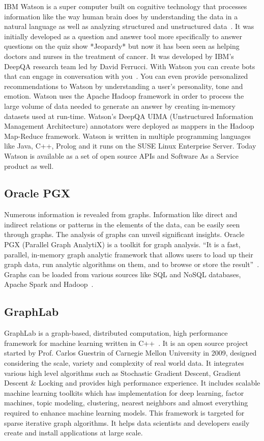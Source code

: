IBM Watson is a super computer built on cognitive technology that
processes information like the way human brain does by understanding
the data in a natural language as well as analyzing structured and
unstructured data~\cite{www-ibmwatson-wiki}.  It was initially
developed as a question and answer tool more specifically to answer
questions on the quiz show *Jeopardy* but now it has been seen as
helping doctors and nurses in the treatment of cancer. It was
developed by IBM's DeepQA research team led by David Ferrucci. With
Watson you can create bots that can engage in conversation with
you~\cite{www-ibmwatson}. You can even provide personalized
recommendations to Watson by understanding a user's personality, tone
and emotion. Watson uses the Apache Hadoop framework in order to
process the large volume of data needed to generate an answer by
creating in-memory datasets used at run-time. Watson's DeepQA UIMA
(Unstructured Information Management Architecture) annotators were
deployed as mappers in the Hadoop Map-Reduce framework. Watson is
written in multiple programming languages like Java, C++, Prolog and
it runs on the SUSE Linux Enterprise Server. Today Watson is available
as a set of open source APIs and Software As a Service product as
well\cite{www-ibmwatson}.

    \pv
    
\subsection{Oracle PGX}

Numerous information is revealed from graphs. Information like direct
and indirect relations or patterns in the elements of the data, can be
easily seen through graphs. The analysis of graphs can unveil
significant insights. Oracle PGX (Parallel Graph AnalytiX) is a
toolkit for graph analysis.  ``It is a fast, parallel, in-memory graph
analytic framework that allows users to load up their graph data, run
analytic algorithms on them, and to browse or store the
result''~\cite{www-pgx}. Graphs can be loaded from various sources
like SQL and NoSQL databases, Apache Spark and Hadoop~\cite{www-ora}.
    
\subsection{GraphLab}

GraphLab is a graph-based, distributed computation, high performance
framework for machine learning written in C++~\cite{www-graphlab}. It
is an open source project started by Prof. Carlos Guestrin of Carnegie
Mellon University in 2009, designed considering the scale, variety and
complexity of real world data. It integrates various high level
algorithms such as Stochastic Gradient Descent, Gradient Descent \&
Locking and provides high performance experience. It includes scalable
machine learning toolkits which has implementation for deep learning,
factor machines, topic modeling, clustering, nearest neighbors and
almost everything required to enhance machine learning models. This
framework is targeted for sparse iterative graph algorithms. It helps
data scientists and developers easily create and install applications
at large scale.


